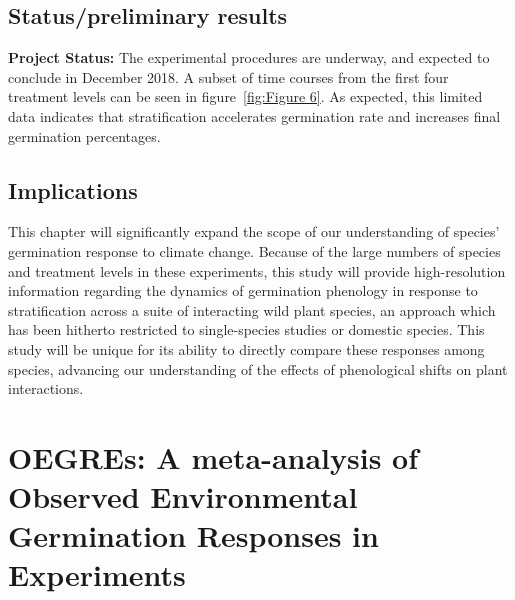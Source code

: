\documentclass[12pt]{article}\usepackage[]{graphicx}\usepackage[]{color}
\begin{document}
\subsection*{Status/preliminary results}
\textbf{Project Status:} The experimental procedures are underway, and expected to conclude in December 2018. A subset of time courses from the first four treatment levels can be seen in figure~\ref{fig:Figure 6}. As expected, this limited data indicates that stratification accelerates germination rate and increases final germination percentages.\\
\subsection*{Implications}
\indent\indent This chapter will significantly expand the scope of our understanding of species' germination response to climate change. Because of the large numbers of species and treatment levels in these experiments, this study will provide high-resolution information regarding the dynamics of germination phenology in response to stratification across a suite of interacting wild plant species, an approach which has been hitherto restricted to single-species studies or domestic species. This study will be unique for its ability to directly compare these responses among species, advancing our understanding of the effects of phenological shifts on plant interactions.
\section*{OEGREs: A meta-analysis of Observed Environmental Germination Responses in Experiments}
\end{document}
